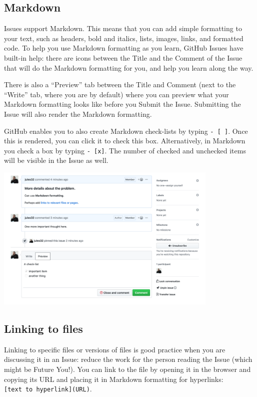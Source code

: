 \documentclass[
  letterpaper,
  DIV=11,
  numbers=noendperiod]{scrreprt}
\begin{document}
\hypertarget{markdown}{%
\subsection{Markdown}\label{markdown}}

Issues support Markdown. This means that you can add simple formatting
to your text, such as headers, bold and italics, lists, images, links,
and formatted code. To help you use Markdown formatting as you learn,
GitHub Issues have built-in help: there are icons between the Title and
the Comment of the Issue that will do the Markdown formatting for you,
and help you learn along the way.

There is also a ``Preview'' tab between the Title and Comment (next to
the ``Write'' tab, where you are by default) where you can preview what
your Markdown formatting looks like before you Submit the Issue.
Submitting the Issue will also render the Markdown formatting.

GitHub enables you to also create Markdown check-lists by typing
\texttt{-\ {[}\ {]}}. Once this is rendered, you can click it to check
this box. Alternatively, in Markdown you check a box by typing
\texttt{-\ {[}x{]}}. The number of checked and unchecked items will be
visible in the Issue as well.

\includegraphics[width=0.8\textwidth,height=\textheight]{./img/issues-checklist.png}

\hypertarget{linking-to-files}{%
\subsection{Linking to files}\label{linking-to-files}}

Linking to specific files or versions of files is good practice when you
are discussing it in an Issue: reduce the work for the person reading
the Issue (which might be Future You!). You can link to the file by
opening it in the browser and copying its URL and placing it in Markdown
formatting for hyperlinks: \texttt{{[}text\ to\ hyperlink{]}(URL)}.
\end{document}
